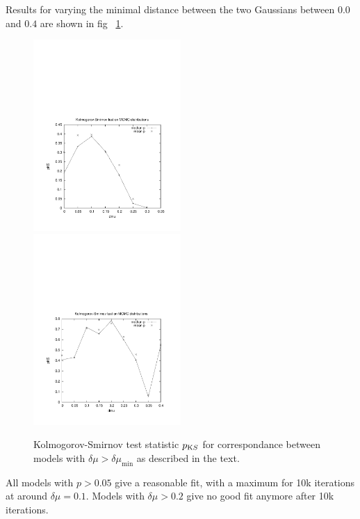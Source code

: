 Results for varying the minimal distance between the two Gaussians
between $0.0$ and $0.4$ are shown in fig ~\ref{fig:kit}.

\begin{figure}
    \begin{center} \hspace{-7mm}
        \includegraphics[width=0.5\textwidth]{fig/10kit.pdf}
        \includegraphics[width=0.5\textwidth]{fig/50kit.pdf}
        \caption{Kolmogorov-Smirnov test statistic $p_{\text KS}$ for
correspondance between models with $\delta\mu>\delta\mu_{\min}$ as
described in the text.}
        \label{fig:kit}
    \end{center}
\end{figure}
All models with $p>0.05$ give a reasonable fit, with a maximum for 10k
iterations at around $\delta \mu = 0.1$. Models with $\delta \mu>0.2$
give no good fit anymore after 10k iterations.

